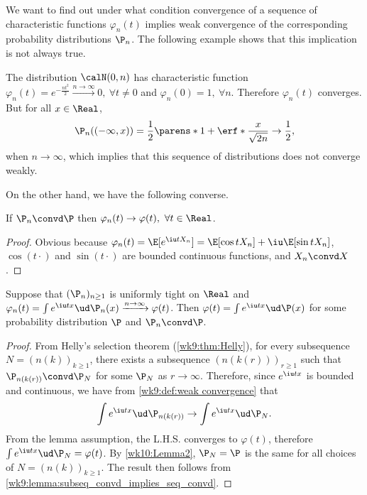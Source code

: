 \documentclass[../aipt.tex]{subfiles}
\begin{document}
We want to find out under what condition convergence of a sequence of characteristic functions $\varphi_n(t)$ implies weak convergence of the corresponding probability distributions $\P_n$. The following example shows that this implication is not always true.

\begin{Example}\label{wk10:example1}
The distribution $\calN(0,n)$ has characteristic function $\varphi_n(t)= e^{-\frac{n t^2}{2}}\xrightarrow{n\to \infty}0, \ \forall t \neq 0$ and $\varphi_n(0)=1,\ \forall n$. Therefore $\varphi_n(t)$ converges. But for all $x\in\Real$,
\begin{align*}
\P_n((-\infty,x))=\frac{1}{2}\parens*{1+\erf*{\frac{x}{\sqrt{2n}}}}\to \frac{1}{2},
\end{align*} 
when $n\to \infty$, which implies that this sequence of distributions does not converge weakly.
\end{Example} 

On the other hand, we have the following converse. 
\begin{Lemma}\label{wk10:Lemma4}
If $\P_n\convd \P$ then $ \varphi_n(t) \to \varphi(t),\ \forall t \in \Real$. 
\end{Lemma}
\begin{proof}
Obvious because $\varphi_n(t)=\E[e^{\iu tX_n}]=\E [\cos t X_n]+\iu\E [\sin t X_n]$, $\cos(t\cdot)$ and $\sin(t\cdot)$ are bounded continuous functions, and $X_n \convd X$. 
\end{proof}
 
\begin{Lemma}\label{wk10:lem:uniformly_tight_and_varphi_conv_implies_convd}
Suppose that $(\P_n)_{n\geq 1}$ is uniformly tight on $\Real$ and $\varphi_n(t)=\int e^{\iu tx} \ud \P_n(x) \xrightarrow{n \to \infty} \varphi(t)$. Then $\varphi(t)=\int e^{\iu tx}\ud \P(x)$ for some probability distribution $\P$ and $\P_n\convd\P$. 
\end{Lemma}
\begin{proof}
From Helly's selection theorem (\cref{wk9:thm:Helly}), for every subsequence $N=(n(k))_{k\geq1}$, there exists a subsequence $(n(k(r)))_{r\geq1}$ such that $\P_{n(k(r))} \convd \P_N$ for some $\P_N$ as $r\to\infty$. Therefore, since $e^{\iu tx}$ is bounded and continuous, we have from \cref{wk9:def:weak convergence} that
\begin{align*}
\int e^{\iu tx} \ud \P_{n(k(r))}\to \int e^{\iu tx} \ud \P_N.
\end{align*}
From the lemma assumption, the L.H.S. converges to $\varphi(t)$, therefore $\int e^{\iu tx} \ud \P_N =\varphi(t)$. By \cref{wk10:Lemma2}, $\P_N = \P$ is the same for all choices of $N=(n(k))_{k\geq1}$. The result then follows from \cref{wk9:lemma:subseq_convd_implies_seq_convd}.
\end{proof}
\end{document}
